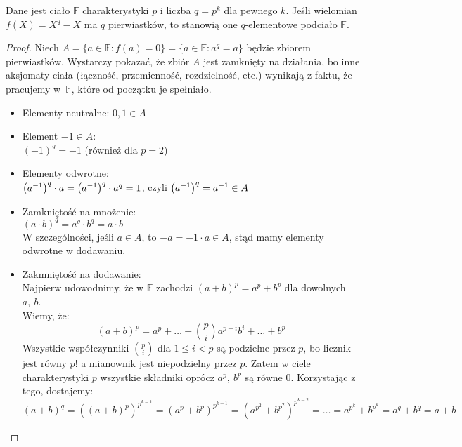 \begin{theorem}
Dane jest ciało \( \mathbb{F} \) charakterystyki \( p \) i liczba \( q = p^k \) dla pewnego \( k \). Jeśli wielomian \( f(X) = X^q - X \) ma \( q \) pierwiastków, to stanowią one \( q \)-elementowe podciało \( \mathbb{F} \).
\end{theorem}
\begin{proof}
    Niech \( A = \{a \in \mathbb{F}: f(a) = 0\} = \{a \in \mathbb{F}: a^q = a\} \) będzie zbiorem pierwiastków. Wystarczy pokazać, że zbiór \( A \) jest zamknięty na działania, bo inne aksjomaty ciała (łączność, przemienność, rozdzielność, etc.) wynikają z faktu, że pracujemy w~\( \mathbb{F} \), które od początku je spełniało.
    \begin{itemize}
        \item Elementy neutralne: \( 0, 1 \in A \)
        \item Element \( -1 \in A \): \\
        \( (-1)^q = -1 \) (również dla \( p = 2 \))
        \item Elementy odwrotne: \\        
        \( \left(a^{-1}\right)^q \cdot a = \left(a^{-1}\right)^q \cdot a^q = 1 \), czyli \( \left(a^{-1}\right)^q = a^{-1} \in A \)
        \item Zamkniętość na mnożenie: \\
        \( (a \cdot b)^q = a^q \cdot b^q = a \cdot b \) \\
        W szczególności, jeśli \( a \in A \), to \( -a = -1 \cdot a \in  A \), stąd mamy elementy odwrotne w dodawaniu.
        \item Zakmniętość na dodawanie: \\
        Najpierw udowodnimy, że w \( \mathbb{F} \) zachodzi \( (a + b)^p = a^p + b^p \) dla dowolnych \( a, \ b \). \\
        Wiemy, że:
        \[
            (a + b)^p = a^p + \ldots + {p \choose i}a^{p-i}b^i + \ldots + b^p
        \]
        Wszystkie współczynniki \( p \choose i \) dla \( 1 \leq i < p \) są podzielne przez \( p \), bo licznik jest równy \( p! \) \linebreak a mianownik jest niepodzielny przez \( p \).
        Zatem w ciele charakterystyki \( p \) wszystkie składniki oprócz \( a^p, \ b^p \) są równe \( 0 \).
        Korzystając z tego, dostajemy:
        \[
            (a + b)^q = ((a + b)^p)^{p^{k-1}} = (a^p + b^p)^{p^{k-1}} = (a^{p^2} + b^{p^2})^{p^{k-2}} = \ldots = a^{p^k} + b^{p^k} = a^q + b^q = a + b
        \]
    \end{itemize}
\end{proof}

